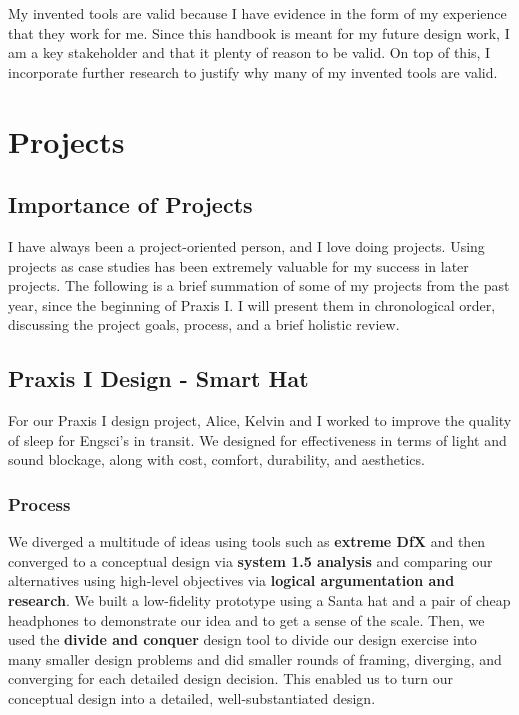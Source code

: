 \documentclass[a4paper,12pt]{article}
\begin{document}
My invented tools are valid because I have evidence in the form of my experience that they work for me. Since this handbook is meant for my future design work, I am a key stakeholder and that it plenty of reason to be valid. On top of this, I incorporate further research to justify why many of my invented tools are valid.




\section{Projects}
\subsection{Importance of Projects}
I have always been a project-oriented person, and I love doing projects. Using projects as case studies has been extremely valuable for my success in later projects. The following is a brief summation of some of my projects from the past year, since the beginning of Praxis I. I will present them in chronological order, discussing the project goals, process, and a brief holistic review.

\subsection{Praxis I Design - Smart Hat}
For our Praxis I design project, Alice, Kelvin and I worked to improve the quality of sleep for Engsci’s in transit. We designed for effectiveness in terms of light and sound blockage, along with cost, comfort, durability, and aesthetics.

\subsubsection{Process}
We diverged a multitude of ideas using tools such as \textbf{extreme DfX} and then converged to a conceptual design via \textbf{system 1.5 analysis} and comparing our alternatives using high-level objectives via \textbf{logical argumentation and research}. We built a low-fidelity prototype using a Santa hat and a pair of cheap headphones to demonstrate our idea and to get a sense of the scale. Then, we used the \textbf{divide and conquer} design tool to divide our design exercise into many smaller design problems and did smaller rounds of framing, diverging, and converging for each detailed design decision. This enabled us to turn our conceptual design into a detailed, well-substantiated design.
\end{document}
